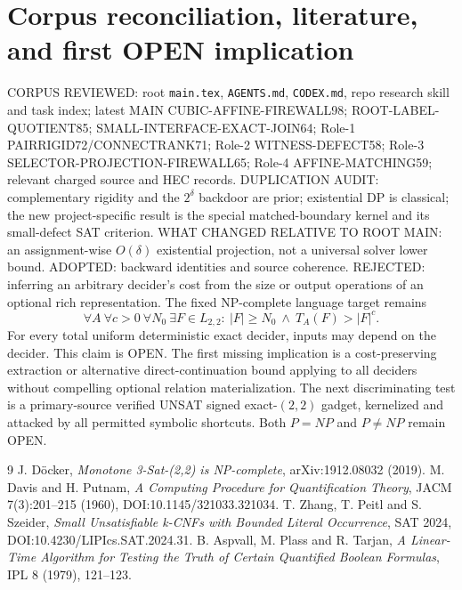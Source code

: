 \documentclass[11pt]{article}
\begin{document}
\section{Corpus reconciliation, literature, and first OPEN implication}
CORPUS REVIEWED: root \texttt{main.tex}, \texttt{AGENTS.md}, \texttt{CODEX.md}, repo research skill and task index; latest MAIN CUBIC-AFFINE-FIREWALL98; ROOT-LABEL-QUOTIENT85; SMALL-INTERFACE-EXACT-JOIN64; Role-1 PAIRRIGID72/CONNECTRANK71; Role-2 WITNESS-DEFECT58; Role-3 SELECTOR-PROJECTION-FIREWALL65; Role-4 AFFINE-MATCHING59; relevant charged source and HEC records. DUPLICATION AUDIT: complementary rigidity and the $2^\delta$ backdoor are prior; existential DP is classical; the new project-specific result is the special matched-boundary kernel and its small-defect SAT criterion. WHAT CHANGED RELATIVE TO ROOT MAIN: an assignment-wise $O(\delta)$ existential projection, not a universal solver lower bound. ADOPTED: backward identities and source coherence. REJECTED: inferring an arbitrary decider's cost from the size or output operations of an optional rich representation.
The fixed NP-complete language target remains
\[
\forall A\ \forall c>0\ \forall N_0\ \exists F\in L_{2,2}:\ |F|\ge N_0\ \wedge\ T_A(F)>|F|^c.
\]
For every total uniform deterministic exact decider, inputs may depend on the decider. This claim is OPEN. The first missing implication is a cost-preserving extraction or alternative direct-continuation bound applying to all deciders without compelling optional relation materialization. The next discriminating test is a primary-source verified UNSAT signed exact-$(2,2)$ gadget, kernelized and attacked by all permitted symbolic shortcuts. Both $P=NP$ and $P\ne NP$ remain OPEN.
\begin{thebibliography}{9}
 J. D\"ocker, \emph{Monotone 3-Sat-(2,2) is NP-complete}, arXiv:1912.08032 (2019).
 M. Davis and H. Putnam, \emph{A Computing Procedure for Quantification Theory}, JACM 7(3):201--215 (1960), DOI:10.1145/321033.321034.
 T. Zhang, T. Peitl and S. Szeider, \emph{Small Unsatisfiable k-CNFs with Bounded Literal Occurrence}, SAT 2024, DOI:10.4230/LIPIcs.SAT.2024.31.
 B. Aspvall, M. Plass and R. Tarjan, \emph{A Linear-Time Algorithm for Testing the Truth of Certain Quantified Boolean Formulas}, IPL 8 (1979), 121--123.
\end{thebibliography}
\end{document}
